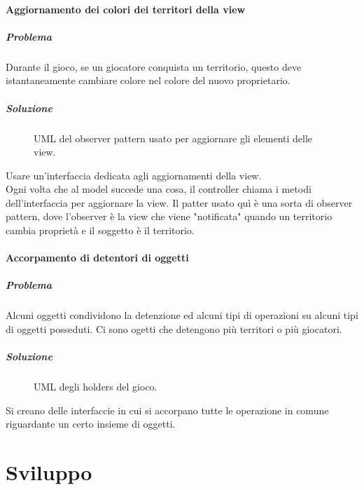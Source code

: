 \documentclass[a4paper,12pt]{report}
\begin{document}
\subsubsection{Aggiornamento dei colori dei territori della view}
\paragraph{Problema}
Durante il gioco, se un giocatore conquista un territorio, questo deve istantaneamente cambiare colore nel colore del nuovo proprietario.
\paragraph{Soluzione}
\begin{figure}[H]
	\centering
	
	\caption{UML del observer pattern usato per aggiornare gli elementi delle view.}
\end{figure}
Usare un'interfaccia dedicata agli aggiornamenti della view.
\\
Ogni volta che al model succede una cosa, il controller chiama i metodi dell'interfaccia per aggiornare la view.
Il patter usato quì è una sorta di observer pattern, dove l'observer è la view che viene "notificata" quando un territorio cambia proprietà e il soggetto è il territorio.
\subsubsection{Accorpamento di detentori di oggetti}
\paragraph{Problema}
Alcuni oggetti condividono la detenzione ed alcuni tipi di operazioni su alcuni tipi di oggetti posseduti.
Ci sono ogetti che detengono più territori o più giocatori.
\paragraph{Soluzione}
\begin{figure}[H]
	\centering
	
	\caption{UML degli holders del gioco.}
\end{figure}
Si creano delle interfaccie in cui si accorpano tutte le operazione in comune riguardante un certo insieme di oggetti.


\chapter{Sviluppo}
\end{document}
